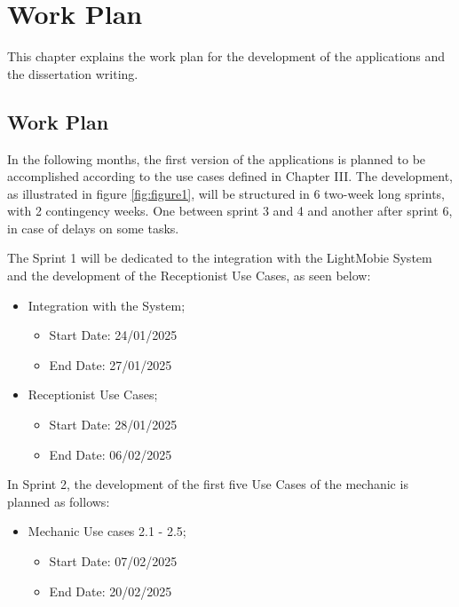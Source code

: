 \chapter{Work Plan}%
\label{chapter:workPlan}

\begin{introduction}
This chapter explains the work plan for the development of the applications and the dissertation writing.
\end{introduction} 


\section{Work Plan}

In the following months, the first version of the applications is planned to be accomplished according to the use cases defined in Chapter III. 
The development, as illustrated in figure \ref{fig:figure1}, will be structured in 6 two-week long sprints, with 2 contingency weeks. One between sprint 3 and 4 and another after sprint 6, in case of delays on some tasks.

The Sprint 1 will be dedicated to the integration with the LightMobie System and the development of the Receptionist Use Cases, as seen below: 

\begin{itemize}
  \item Integration with the System;
  \begin{itemize}
      \item Start Date: 24/01/2025 
      \item End Date: 27/01/2025 
  \end{itemize}
    \item Receptionist Use Cases;
    \begin{itemize}
        \item Start Date: 28/01/2025 
        \item End Date: 06/02/2025 
    \end{itemize}
  \end{itemize}

In Sprint 2, the development of the first five Use Cases of the mechanic is planned as follows:  

\begin{itemize}
  \item Mechanic Use cases 2.1 - 2.5;
    \begin{itemize}
      \item Start Date: 07/02/2025 
      \item End Date: 20/02/2025 
  \end{itemize}
\end{itemize}

